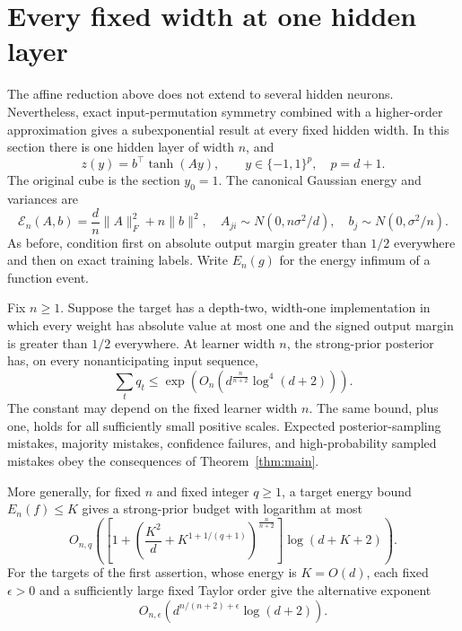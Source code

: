 \section{Every fixed width at one hidden layer}\label{sec:fixed-width}
The affine reduction above does not extend to several hidden neurons. Nevertheless, exact input-permutation symmetry combined with a higher-order approximation gives a subexponential result at every fixed hidden width. In this section there is one hidden layer of width $n$, and
\[
 z(y)=b^\top\tanh(Ay),\qquad y\in\{-1,1\}^{p},\quad p=d+1.
\]
The original cube is the section $y_0=1$. The canonical Gaussian energy and variances are
\[
 \mathcal E_n(A,b)=\frac dn\|A\|_F^2+n\|b\|^2,
 \quad A_{ji}\sim N(0,n\sigma^2/d),
 \quad b_j\sim N(0,\sigma^2/n).
\]
As before, condition first on absolute output margin greater than $1/2$ everywhere and then on exact training labels. Write $E_n(g)$ for the energy infimum of a function event.

\begin{theorem}\label{thm:fixed-width}
Fix $n\ge1$. Suppose the target has a depth-two, width-one implementation in which every weight has absolute value at most one and the signed output margin is greater than $1/2$ everywhere. At learner width $n$, the strong-prior posterior has, on every nonanticipating input sequence,
\begin{equation}\label{eq:fixed-width-budget}
 \sum_tq_t\le
 \exp\!\left(O_n\!\left(d^{\frac n{n+2}}\log^4(d+2)\right)\right).
\end{equation}
The constant may depend on the fixed learner width $n$. The same bound, plus one, holds for all sufficiently small positive scales. Expected posterior-sampling mistakes, majority mistakes, confidence failures, and high-probability sampled mistakes obey the consequences of Theorem~\ref{thm:main}.

More generally, for fixed $n$ and fixed integer $q\ge1$, a target energy bound $E_n(f)\le K$ gives a strong-prior budget with logarithm at most
\begin{equation}\label{eq:general-width-budget}
 O_{n,q}\!\left(
 \left[1+\left(\frac{K^2}{d}+K^{1+1/(q+1)}\right)^{\frac n{n+2}}\right]
 \log(d+K+2)\right).
\end{equation}
For the targets of the first assertion, whose energy is $K=O(d)$,
each fixed $\epsilon>0$ and a sufficiently large fixed Taylor order give
the alternative exponent
\[
 O_{n,\epsilon}(d^{n/(n+2)+\epsilon}\log(d+2)).
\]
\end{theorem}

